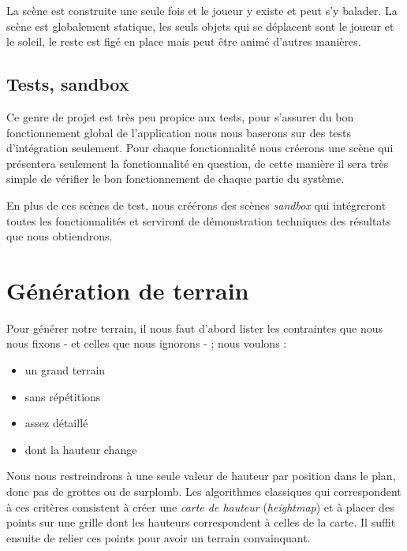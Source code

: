 \documentclass[11pt]{article} %
\begin{document}

La scène est construite une seule fois et le joueur y existe et peut s'y balader. La scène est globalement statique, les seuls objets qui se déplacent sont le joueur et le soleil, le reste est figé en place mais peut être animé d'autres manières.

\subsection{Tests, sandbox}

Ce genre de projet est très peu propice aux tests, pour s'assurer du bon fonctionnement global de l'application nous nous baserons sur des tests d'intégration seulement. Pour chaque fonctionnalité nous créerons une scène qui présentera seulement la fonctionnalité en question, de cette manière il sera très simple de vérifier le bon fonctionnement de chaque partie du système.

En plus de ces scènes de test, nous créérons des scènes \textit{sandbox} qui intégreront toutes les fonctionnalités et serviront de démonstration techniques des résultats que nous obtiendrons.


\section{Génération de terrain}

Pour générer notre terrain, il nous faut d'abord lister les contraintes que nous nous fixons - et celles que nous ignorons - ; nous voulons :
\begin{itemize}
	\item{un grand terrain}
	\item{sans répétitions}
	\item{assez détaillé}
	\item{dont la hauteur change}
\end{itemize}

Nous nous restreindrons à une seule valeur de hauteur par position dans le plan, donc pas de grottes ou de surplomb. Les algorithmes classiques qui correspondent à ces critères consistent à créer une \textit{carte de hauteur} (\textit{heightmap}) et à placer des points sur une grille dont les hauteurs correspondent à celles de la carte. Il suffit ensuite de relier ces points pour avoir un terrain convainquant.
\end{document}
